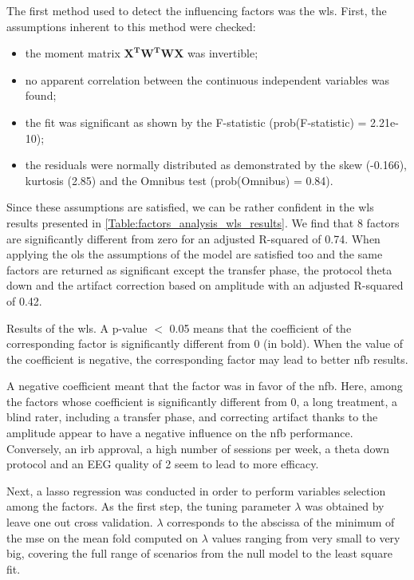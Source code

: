 The first method used to detect the influencing factors was the \gls{wls}. First, the assumptions inherent to this method were checked: 
\begin{itemize}
	\item the moment matrix $\mathbf{{X}^{T}W^{T}WX}$ was invertible;
  \item no apparent correlation between the continuous independent variables was found; 
  \item the fit was significant as shown by the F-statistic (prob(F-statistic) = 2.21e-10); 
  \item the residuals were normally distributed as demonstrated by the skew (-0.166), kurtosis (2.85) and the Omnibus test (prob(Omnibus) = 0.84).
\end{itemize}

Since these assumptions are satisfied, we can be rather confident in the \gls{wls} results presented in \cref{Table:factors_analysis_wls_results}. 
We find that 8 factors are significantly different from zero for an adjusted R-squared of 0.74. When applying the \gls{ols} the assumptions of the 
model are satisfied too and the same factors are returned as significant except the transfer phase, 
the protocol theta down and the artifact correction based on amplitude with an adjusted R-squared of 0.42. 

\begin{table}[h!]
  \centering
  \caption{Results of the \gls{wls}. A p-value $<$ 0.05 means that the coefficient of the corresponding factor is significantly different from $0$ (in bold). 
	When the value of the coefficient is negative, the corresponding factor may lead to better \gls{nfb} results.}
  
  \label{Table:factors_analysis_wls_results}
\end{table}

A negative coefficient meant that the factor was in favor of the \gls{nfb}. Here, among the factors whose coefficient is significantly 
different from 0, a long treatment, a blind rater, including a transfer phase, and correcting artifact thanks to the amplitude appear 
to have a negative influence on the \gls{nfb} performance. Conversely, an \gls{irb} approval, a high number of sessions per week, a theta
down protocol and an EEG quality of 2 seem to lead to more efficacy. 

Next, a \gls{lasso} regression was conducted in order to perform variables selection among the factors. As the first step, the tuning 
parameter $\lambda$ was obtained by leave one out cross validation. 
$\lambda$ corresponds to the abscissa of the minimum of the \gls{mse} on the mean fold computed on $\lambda$ values ranging from very 
small to very big, covering the full range of scenarios from the null model to the least square fit.

